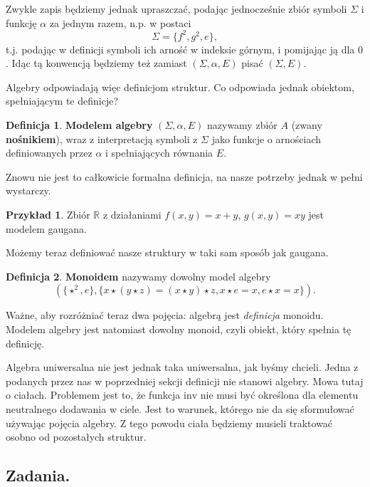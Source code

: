 \documentclass{book}
\theoremstyle{definition}
\newtheorem{definition}{Definicja}[section]
\newtheorem{example}{Przykład}[section]
\begin{document}
Zwykle zapis będziemy jednak upraszczać,
	podając jednocześnie zbiór symboli $\Sigma$ i funkcję $\alpha$ za jednym razem,
	n.p. w postaci
\begin{equation}
	\Sigma = \{f^2, g^2, e\},
\end{equation}
t.j. podając w definicji symboli ich arność w indeksie górnym, i pomijając ją dla $0$.
Idąc tą konwencją będziemy też zamiast $(\Sigma, \alpha, E)$ pisać $(\Sigma, E)$.

Algebry odpowiadają więc definicjom struktur.
Co odpowiada jednak obiektom, spełniającym te definicje?

\begin{definition}
    \textbf{Modelem algebry} $(\Sigma, \alpha, E)$ nazywamy zbiór $A$ (zwany \textbf{nośnikiem}),
	wraz z interpretacją symboli z $\Sigma$ jako funkcje o arnościach definiowanych przez $\alpha$ i spełniających równania $E$.
\end{definition}
Znowu nie jest to całkowicie formalna definicja,
na nasze potrzeby jednak w pełni wystarczy.

\begin{example}
	Zbiór $\mathbb{R}$ z działaniami $f(x, y) = x + y$, $g(x, y) = xy$ jest modelem gaugana.
\end{example}

Możemy teraz definiować nasze struktury w taki sam sposób jak gaugana.
\begin{definition}
	\textbf{Monoidem} nazywamy dowolny model algebry
	\begin{equation*}
		(\{\star^2, e\}, \{ x \star (y \star z) = (x \star y) \star z, x \star e = x, e \star x = x \}).
	\end{equation*}
\end{definition}

Ważne, aby rozróżniać teraz dwa pojęcia: algebrą jest \textit{definicja} monoidu.
Modelem algebry jest natomiast dowolny monoid,
	czyli obiekt,
	który spełnia tę definicję.

Algebra uniwersalna nie jest jednak taka uniwersalna,
	jak byśmy chcieli.
Jedna z podanych przez nas w poprzedniej sekcji definicji nie stanowi algebry.
Mowa tutaj o ciałach.
Problemem jest to,
	że funkcja $\mathrm{inv}$ nie musi być określona dla elementu neutralnego dodawania w ciele.
Jest to warunek,
	którego nie da się sformułować używając pojęcia algebry.
Z tego powodu ciała będziemy musieli traktować osobno od pozostałych struktur.

\subsection{Zadania.}
\end{document}

